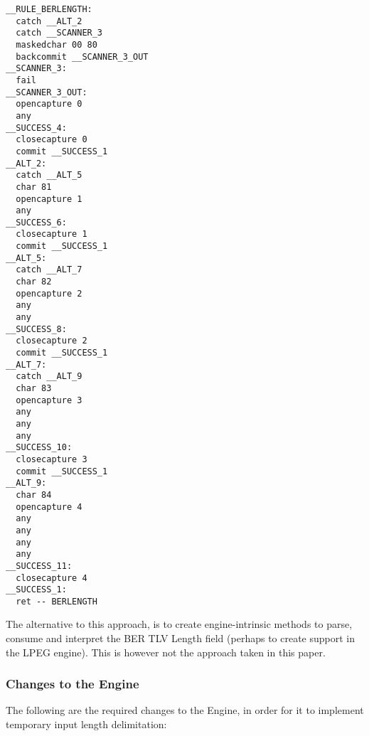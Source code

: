 \begin{changemargin}{-60mm}{0mm}
\begin{myquote}
\begin{verbatim}
__RULE_BERLENGTH:
  catch __ALT_2
  catch __SCANNER_3
  maskedchar 00 80
  backcommit __SCANNER_3_OUT
__SCANNER_3:
  fail
__SCANNER_3_OUT:
  opencapture 0
  any
__SUCCESS_4:
  closecapture 0
  commit __SUCCESS_1
__ALT_2:
  catch __ALT_5
  char 81
  opencapture 1
  any
__SUCCESS_6:
  closecapture 1
  commit __SUCCESS_1
__ALT_5:
  catch __ALT_7
  char 82
  opencapture 2
  any
  any
__SUCCESS_8:
  closecapture 2
  commit __SUCCESS_1
__ALT_7:
  catch __ALT_9
  char 83
  opencapture 3
  any
  any
  any
__SUCCESS_10:
  closecapture 3
  commit __SUCCESS_1
__ALT_9:
  char 84
  opencapture 4
  any
  any
  any
  any
__SUCCESS_11:
  closecapture 4
__SUCCESS_1:
  ret -- BERLENGTH
\end{verbatim}
\end{myquote}
\end{changemargin}


The alternative to this approach, is to create engine-intrinsic methods to 
parse, consume and interpret the BER TLV Length field (perhaps to create
support in the LPEG engine).  This is however
not the approach taken in this paper.

\subsubsection{Changes to the Engine}


The following are the required changes to the Engine, in order for it to 
implement temporary input length delimitation:

